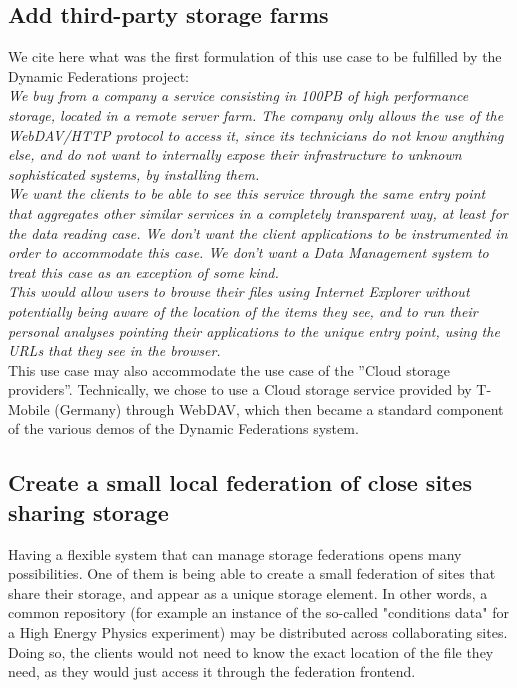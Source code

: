 \documentclass[12pt]{article} %
\begin{document}
\subsection{Add third-party storage farms}

We cite here what was the first formulation of this use case to be fulfilled by the Dynamic Federations project: \\
\textit{We buy from a company a service consisting in 100PB of high performance storage, located in a remote server farm. The company only allows the use of the WebDAV/HTTP protocol to access it, since its technicians do not know anything else, and do not want to internally expose their infrastructure to unknown sophisticated systems, by installing them.\\
We want the clients to be able to see this service through the same entry point that aggregates other similar services in a completely transparent way, at least for the data reading case. We don't want the client applications to be instrumented in order to accommodate this case. We don't want a Data Management system to treat this case as an exception of some kind.\\
This would allow users to browse their files using Internet Explorer without potentially being aware of the location of the items they see, and to run their personal analyses pointing their applications to the unique entry point, using the URLs that they see in the browser.}\\

This use case may also accommodate the use case of the ''Cloud storage providers''. Technically, we chose to use a Cloud storage service provided by T-Mobile (Germany) through WebDAV, which then became a standard component of the various demos of the Dynamic Federations system.

\subsection{Create a small local federation of close sites sharing storage}

Having a flexible system that can manage storage federations opens many possibilities. One of them is being able to create a small federation of sites that share their storage, and appear as a unique storage element. In other words, a common repository (for example an instance of the so-called "conditions data" for a High Energy Physics experiment) may be distributed across collaborating sites. Doing so, the clients would not  need to know the exact location of the file they need, as they would just access it through the federation frontend.
\end{document}

